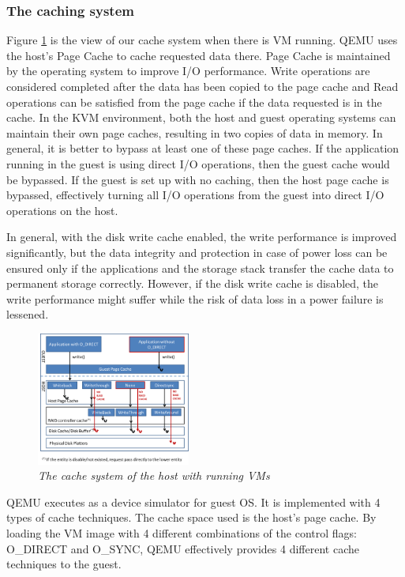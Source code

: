 \documentclass{acmsig}
\begin{document}
  \subsubsection{The caching system}
  Figure \ref{cache_system} is the view of our cache system when there is VM running. QEMU uses the host's Page Cache to cache requested data there. Page Cache is maintained by the operating system to improve I/O performance. Write operations are considered completed after the data has been copied to the page cache and Read operations can be satisfied from the page cache if the data requested is in the cache. In the KVM environment, both the host and guest operating systems can maintain their own page caches, resulting in two copies of data in memory. In general, it is better to bypass at least one of these page caches. If the application running in the guest is using direct I/O operations, then the guest cache would be bypassed. If the guest is set up with no caching, then the host page cache is bypassed, effectively turning all I/O operations from the guest into direct I/O operations on the host.

  In general, with the disk write cache enabled, the write performance is improved significantly, but the data integrity and protection in case of power loss can be ensured only if the applications and the storage stack transfer the cache data to permanent storage correctly. However, if the disk write cache is disabled, the write performance might suffer while the risk of data loss in a power failure is lessened.

  \begin{figure}[htbp]
    \centering
    \includegraphics[width=0.45\textwidth]{figures/cachesystem.png}
    \caption{\textit{The cache system of the host with running VMs }}
    \label{cache_system}
\end{figure}

  QEMU executes as a device simulator for guest OS. It is implemented with 4 types of cache techniques. The cache space used is the host's page cache. By loading the VM image with 4 different combinations of the control flags: O\_DIRECT and O\_SYNC, QEMU effectively provides 4 different cache techniques to the guest.
\end{document}
